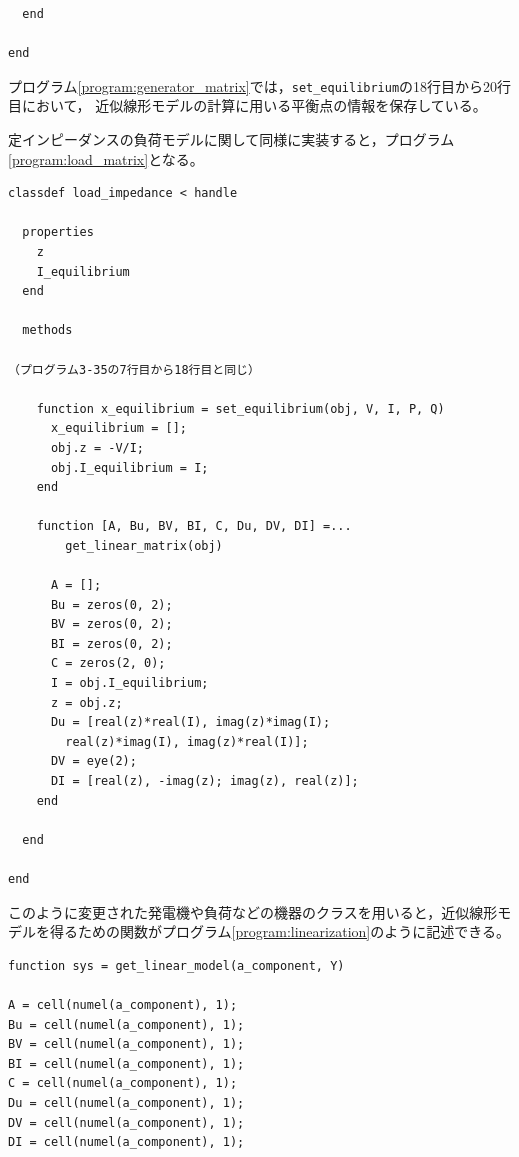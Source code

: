 \documentclass[tombow,dvipdfmx]{corona-a5-1.1}
\begin{document}
\begin{例}[近似線形モデルの実装]
\begin{PROGRAMA}[count,title={generator.m}]
\begin{verbatim}
  end

end
\end{verbatim}
\end{PROGRAMA}


プログラム\ref{program:generator_matrix}では，\verb|set_equilibrium|の18行目から20行目において，
近似線形モデルの計算に用いる平衡点の情報を保存している。

定インピーダンスの負荷モデルに関して同様に実装すると，プログラム\ref{program:load_matrix}となる。

\smallskip
\begin{PROGRAMA}[count,title={load\_impedance.m}]\label{program:load_matrix}
\begin{verbatim}
classdef load_impedance < handle
  
  properties
    z
    I_equilibrium
  end
  
  methods

（プログラム3-35の7行目から18行目と同じ）
   
    function x_equilibrium = set_equilibrium(obj, V, I, P, Q)
      x_equilibrium = [];
      obj.z = -V/I;
      obj.I_equilibrium = I;
    end
    
    function [A, Bu, BV, BI, C, Du, DV, DI] =...
        get_linear_matrix(obj)
      
      A = [];
      Bu = zeros(0, 2);
      BV = zeros(0, 2);
      BI = zeros(0, 2);
      C = zeros(2, 0);
      I = obj.I_equilibrium;
      z = obj.z;
      Du = [real(z)*real(I), imag(z)*imag(I);
        real(z)*imag(I), imag(z)*real(I)];
      DV = eye(2);
      DI = [real(z), -imag(z); imag(z), real(z)];
    end
    
  end
  
end
\end{verbatim}
\end{PROGRAMA}

このように変更された発電機や負荷などの機器のクラスを用いると，近似線形モデルを得るための関数がプログラム\ref{program:linearization}のように記述できる。

\smallskip
\begin{PROGRAMA}[count,title={get\_linear\_model.m}]\label{program:linearization}
\begin{verbatim}
function sys = get_linear_model(a_component, Y)

A = cell(numel(a_component), 1);
Bu = cell(numel(a_component), 1);
BV = cell(numel(a_component), 1);
BI = cell(numel(a_component), 1);
C = cell(numel(a_component), 1);
Du = cell(numel(a_component), 1);
DV = cell(numel(a_component), 1);
DI = cell(numel(a_component), 1);


\end{verbatim}
\end{PROGRAMA}
\end{例}
\end{document}
